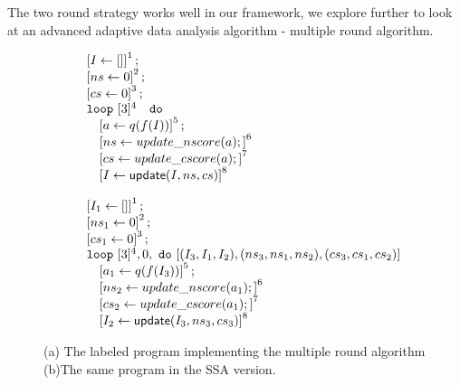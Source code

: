 %
The two round strategy works well in our framework, we explore further to look at an advanced adaptive data analysis algorithm - multiple round algorithm.
%
%
{\small
\begin{figure}
    \begin{subfigure}{0.35\textwidth}
    \begin{centering}
    $
    \begin{array}{l}
    \left[ I \leftarrow []  \right]^1; \\
    \left[ \mathrel{ ns \leftarrow 0 }  \right]^{2}; \\
     \left[ \mathrel{ cs \leftarrow 0 }  \right]^{3}; \\
    \mathtt{loop} ~ [3]^{4} ~  
    \ ~ \mathtt{do} ~ \\ 
    \quad \left[ a \leftarrow q(f( I))  \right]^{5}; \\
    \quad \left[ \mathrel{ ns \leftarrow update\_nscore(a) };  \right]^{6}\\
    \quad \left[ \mathrel{ cs \leftarrow update\_cscore(a) };  \right]^{7}\\
    \quad \left[ I \leftarrow \mathsf{update} ( I, ns, cs)   \right]^{8}
\end{array}
    $
    \caption{}
    \end{centering}
    \end{subfigure}
    \begin{subfigure}{0.4\textwidth}
    \begin{centering}
    $
    \begin{array}{l}
    \left[ I_1 \leftarrow []  \right]^1; \\
    \left[ \mathrel{ ns_1 \leftarrow 0 }  \right]^{2}; \\
     \left[ \mathrel{ cs_1 \leftarrow 0 }  \right]^{3}; \\
    \mathtt{loop} ~ [3]^{4} , 0 ,  
     ~ \mathtt{do} ~ [(I_3, I_1,I_2),(ns_3, ns_1,ns_2),(cs_3, cs_1,cs_2) ] \\ 
    \quad \left[ a_1 \leftarrow q(f(I_3))  \right]^{5}; \\
   \quad \left[ \mathrel{ ns_2 \leftarrow update\_nscore(a_1) };  \right]^{6}\\
   \quad \left[ \mathrel{ cs_2 \leftarrow update\_cscore(a_1) };  \right]^{7}\\
   \quad \left[ I_2 \leftarrow \mathsf{update} (I_3, ns_3, cs_3)   \right]^{8}
\end{array}
   $
   \caption{}
    \end{centering}
    \end{subfigure}
    \caption{(a) The labeled program implementing the multiple round algorithm (b)The same program in the SSA version.}
    \label{fig:multi_code}
    \end{figure}
}
